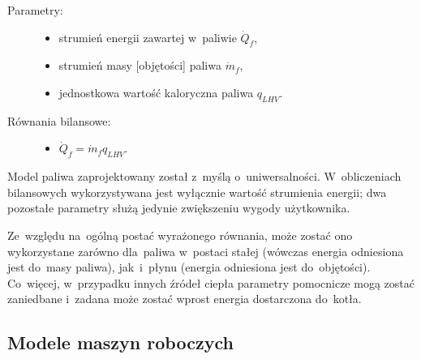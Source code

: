 \begin{description}

	\item[Parametry:] \hfill

		\begin{itemize}

			\item strumień energii zawartej w~paliwie $\dot Q_f$,

			\item strumień masy [objętości] paliwa $\dot m_f$,

			\item jednostkowa wartość kaloryczna paliwa $q_{LHV}$.

		\end{itemize}

	\item[Równania bilansowe:] \hfill

		\begin{itemize}

			\item $\dot Q_f = \dot m_f q_{LHV}$.

		\end{itemize}

\end{description}

Model paliwa zaprojektowany został z~myślą o~uniwersalności.
W~obliczeniach bilansowych wykorzystywana jest wyłącznie wartość
strumienia energii; dwa pozostałe parametry służą jedynie zwiększeniu
wygody użytkownika.

Ze~względu na~ogólną postać wyrażonego równania, może zostać ono
wykorzystane zarówno dla~paliwa w~postaci stałej (wówczas energia
odniesiona jest do~masy paliwa), jak~i~płynu (energia odniesiona jest
do~objętości). Co~więcej, w~przypadku innych źródeł ciepła parametry
pomocnicze mogą zostać zaniedbane i~zadana może zostać wprost energia
dostarczona do~kotła.


\subsection{Modele maszyn roboczych}

\newcommand\wykresTs[1]{
	\subfloat[][Wykres T-s przemiany]{
		\begin{tikzpicture}
			\begin{axis}[
				xtick=\empty,
				ytick=\empty,
				axis lines=left,
				ylabel=T,
				xlabel=s,
				height=5cm,
				every axis x label/.style={at={(xticklabel cs:.95,.2cm)}},
				every axis y label/.style={at={(yticklabel cs:.9,.2cm)}}
			]
				\addplot+[no marks, smooth] table[x=s, y=T] {wykresy/_nasyc.txt};
				#1
			\end{axis}
		\end{tikzpicture}
	}
}




